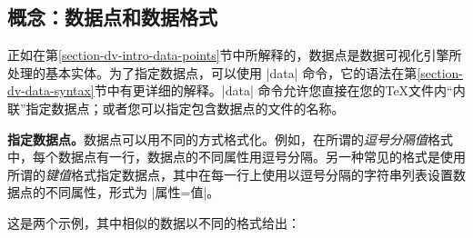 \subsection{概念：数据点和数据格式}


正如在第\ref{section-dv-intro-data-points}节中所解释的，数据点是数据可视化引擎所处理的基本实体。为了指定数据点，可以使用 |data| 命令，它的语法在第\ref{section-dv-data-syntax}节中有更详细的解释。|data| 命令允许您直接在您的\TeX 文件内``内联''指定数据点；或者您可以指定包含数据点的文件的名称。

\medskip

\textbf{指定数据点。}数据点可以用不同的方式格式化。例如，在所谓的\emph{逗号分隔值}格式中，每个数据点有一行，数据点的不同属性用逗号分隔。另一种常见的格式是使用所谓的\emph{键值}格式指定数据点，其中在每一行上使用以逗号分隔的字符串列表设置数据点的不同属性，形式为 |属性=值|。


这是两个示例，其中相似的数据以不同的格式给出：
%
\begin{codeexample}[preamble={\usetikzlibrary{datavisualization}}]
\end{codeexample}


